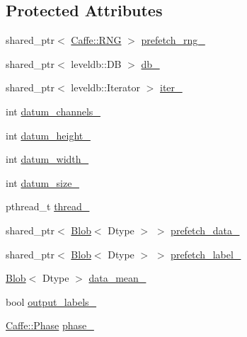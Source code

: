 \subsection*{Protected Attributes}
\begin{DoxyCompactItemize}
\item 
shared\+\_\+ptr$<$ \hyperlink{classcaffe_1_1_caffe_1_1_r_n_g}{Caffe\+::\+R\+N\+G} $>$ \hyperlink{classcaffe_1_1_data_layer_a1ec4389cc48a637748446900ccab7767}{prefetch\+\_\+rng\+\_\+}
\item 
shared\+\_\+ptr$<$ leveldb\+::\+D\+B $>$ \hyperlink{classcaffe_1_1_data_layer_a9287a92e591da10a3d6f38333aad301f}{db\+\_\+}
\item 
shared\+\_\+ptr$<$ leveldb\+::\+Iterator $>$ \hyperlink{classcaffe_1_1_data_layer_a5f02294c8b3cf2a31f4e97accf3a23dd}{iter\+\_\+}
\item 
int \hyperlink{classcaffe_1_1_data_layer_a33f86db700bff9553d05151c04a95e0d}{datum\+\_\+channels\+\_\+}
\item 
int \hyperlink{classcaffe_1_1_data_layer_a05b52e5bbe760b831728f1f0c0bed60b}{datum\+\_\+height\+\_\+}
\item 
int \hyperlink{classcaffe_1_1_data_layer_a87acabb37f849641efdcb605031dc352}{datum\+\_\+width\+\_\+}
\item 
int \hyperlink{classcaffe_1_1_data_layer_a9b2617e874504b7780584d869d461bf3}{datum\+\_\+size\+\_\+}
\item 
pthread\+\_\+t \hyperlink{classcaffe_1_1_data_layer_a62fda7f98477da13464f787e72be0b09}{thread\+\_\+}
\item 
shared\+\_\+ptr$<$ \hyperlink{classcaffe_1_1_blob}{Blob}$<$ Dtype $>$ $>$ \hyperlink{classcaffe_1_1_data_layer_a6c61442271fe47f944c2b07a794b4245}{prefetch\+\_\+data\+\_\+}
\item 
shared\+\_\+ptr$<$ \hyperlink{classcaffe_1_1_blob}{Blob}$<$ Dtype $>$ $>$ \hyperlink{classcaffe_1_1_data_layer_a3bd700fc3b186d60ce90329a57923830}{prefetch\+\_\+label\+\_\+}
\item 
\hyperlink{classcaffe_1_1_blob}{Blob}$<$ Dtype $>$ \hyperlink{classcaffe_1_1_data_layer_a83d1439647876032a72468a7a8c4b889}{data\+\_\+mean\+\_\+}
\item 
bool \hyperlink{classcaffe_1_1_data_layer_ae2d9349591a22759acfce89a3ff7908a}{output\+\_\+labels\+\_\+}
\item 
\hyperlink{classcaffe_1_1_caffe_ad2993dccc4a615c39259ed7f0d0e24e9}{Caffe\+::\+Phase} \hyperlink{classcaffe_1_1_data_layer_adf7d23050e73666ed3305715624599c2}{phase\+\_\+}
\end{DoxyCompactItemize}
